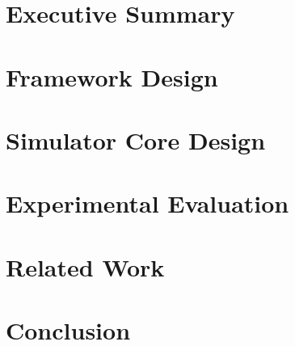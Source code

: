 \documentclass[conference, 12pt]{IEEEtran}
\begin{document}

\section{Executive Summary}

\section{Framework Design}

\section{Simulator Core Design}

\section{Experimental Evaluation}

\section{Related Work}



\cite{ref:ocelot-pact}

% 


\section{Conclusion}



\end{document}
